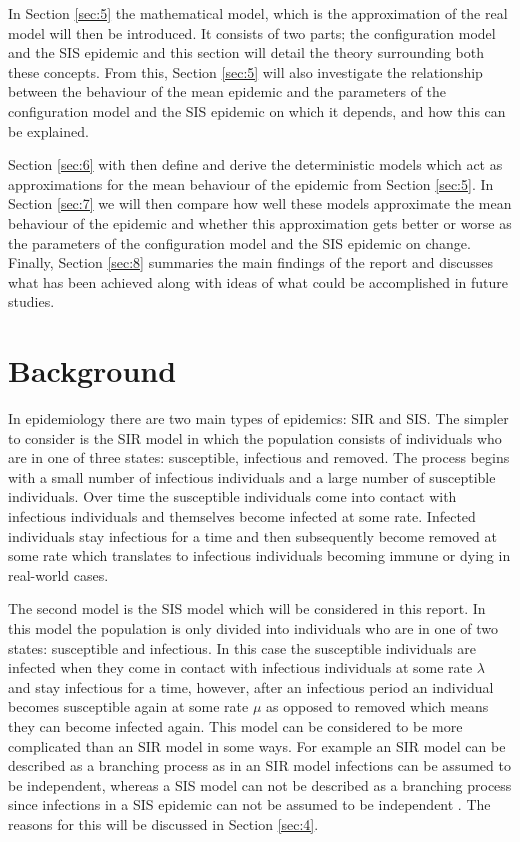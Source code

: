 \documentclass{uonmathsreport}
\begin{document}
In Section \ref{sec:5} the mathematical model, which is the approximation of the real model will then be introduced. It consists of two parts; the configuration model and the SIS epidemic and this section will detail the theory surrounding both these concepts. From this, Section \ref{sec:5} will also investigate the relationship between the behaviour of the mean epidemic and the parameters of the configuration model and the SIS epidemic on which it depends, and how this can be explained.

Section \ref{sec:6} with then define and derive the deterministic models which act as approximations for the mean behaviour of the epidemic from Section \ref{sec:5}. In Section \ref{sec:7} we will then compare how well these models approximate the mean behaviour of the epidemic and whether this approximation gets better or worse as the parameters of the configuration model and the SIS epidemic on change. Finally, Section \ref{sec:8} summaries the main findings of the report and discusses what has been achieved along with ideas of what could be accomplished in future studies.


\newpage
\section{Background} \label{sec:3}
\indent
In epidemiology there are two main types of epidemics: SIR and SIS. The simpler to consider is the SIR model in which the population consists of individuals who are in one of three states: susceptible, infectious and removed. The process begins with a small number of infectious individuals and a large number of susceptible individuals. Over time the susceptible individuals come into contact with infectious individuals and themselves become infected at some rate. Infected individuals stay infectious for a time and then subsequently become removed at some rate which translates to infectious individuals becoming immune or dying in real-world cases.
	
The second model is the SIS model which will be considered in this report. In this model the population is only divided into individuals who are in one of two states: susceptible and infectious. In this case the susceptible individuals are infected when they come in contact with infectious individuals at some rate $\lambda$ and stay infectious for a time, however, after an infectious period an individual becomes susceptible again at some rate $\mu$ as opposed to removed which means they can become infected again. This model can be considered to be more complicated than an SIR model in some ways. For example an SIR model can be described as a branching process as in an SIR model infections can be assumed to be independent, whereas a SIS model can not be described as a branching process since infections in a SIS epidemic can not be assumed to be independent \cite{bibandersson3}. The reasons for this will be discussed in Section \ref{sec:4}.
	
\end{document}
